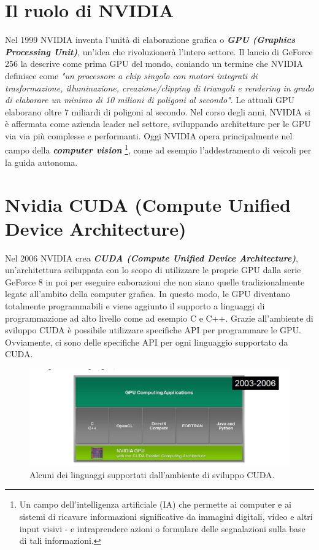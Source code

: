 \section{Il ruolo di NVIDIA}
\noindent Nel 1999 NVIDIA inventa l'unità di elaborazione grafica o \textit{\textbf{GPU (Graphics Processing Unit)}}, un'idea che rivoluzionerà l'intero settore. Il lancio di GeForce 256 la descrive come prima GPU del mondo, coniando un termine che NVIDIA definisce come \emph{"un processore a chip singolo con motori integrati di trasformazione, illuminazione, creazione/clipping di triangoli e rendering in grado di elaborare un minimo di 10 milioni di poligoni al secondo"}. Le attuali GPU elaborano oltre 7 miliardi di poligoni al secondo\cite{Nvidia-story}. 
Nel corso degli anni, NVIDIA si è affermata come azienda leader nel settore, sviluppando architetture per le GPU via via più complesse e performanti. Oggi NVIDIA opera principalmente nel campo della \textit{\textbf{computer vision}} \footnote{Un campo dell'intelligenza artificiale (IA) che permette ai computer e ai sistemi di ricavare informazioni significative da immagini digitali, video e altri input visivi - e intraprendere azioni o formulare delle segnalazioni sulla base di tali informazioni.}, come ad esempio l'addestramento di veicoli per la guida autonoma.

\section{Nvidia CUDA (Compute Unified Device Architecture)}
\noindent Nel 2006 NVIDIA crea \textit{\textbf{CUDA (Compute Unified Device Architecture)}}\cite{Nvidia-story}, un'architettura sviluppata con lo scopo di utilizzare le proprie GPU dalla serie GeForce 8 in poi per eseguire eaborazioni che non siano quelle tradizionalmente legate all'ambito della computer grafica.
In questo modo, le GPU diventano totalmente programmabili e viene aggiunto il supporto a linguaggi di programmazione ad alto livello come ad esempio C e C++. Grazie all'ambiente di sviluppo CUDA è possibile utilizzare specifiche API per programmare le GPU. Ovviamente, ci sono delle specifiche API per ogni linguaggio supportato da CUDA.
\begin{figure}[h!]
    \centering
    \includegraphics[scale=0.6]{img/cuda_supported_programming_languages.png}
    \caption{Alcuni dei linguaggi supportati dall'ambiente di sviluppo CUDA.}
\end{figure}

